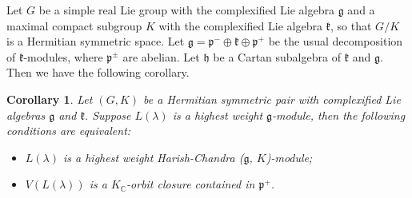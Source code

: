 \documentclass{amsart}[12pt]
\newtheorem{Cor}{Corollary}[section]
\numberwithin{equation}{section}
\begin{document}



Let $G$ be a simple real Lie group with the complexified Lie algebra $\mathfrak{g}$ and a maximal compact subgroup $K$ with the complexified Lie algebra $\mathfrak{k}$, so that $G/K$ is a Hermitian symmetric space. Let $\mathfrak{g} =\mathfrak{p}^-\oplus\mathfrak{k}\oplus\mathfrak{p}^+$ be the usual decomposition of $\mathfrak{k}$-modules, where $\mathfrak{p}^\pm$ are abelian.  Let $\mathfrak{h}$ be a Cartan subalgebra of $\mathfrak{k}$ and $\mathfrak{g}$. Then we have the following corollary.


\begin{Cor}\label{HC}Let $(G,K)$ be a Hermitian symmetric pair with complexified Lie algebras $\mathfrak{g}$ and $\mathfrak{k}$. Suppose $L(\lambda)$ is a highest weight $\mathfrak{g}$-module, then the following conditions are equivalent:
	\begin{itemize}
		\item [(1)]  $L(\lambda)$ is a highest weight Harish-Chandra ($\mathfrak{g}$, $K$)-module;
		\item [(2)] $V(L(\lambda))$ is a $K_{\mathbb{C}}$-orbit closure contained in $\mathfrak{p}^+$.
		
	\end{itemize}

\end{Cor}
\end{document}
